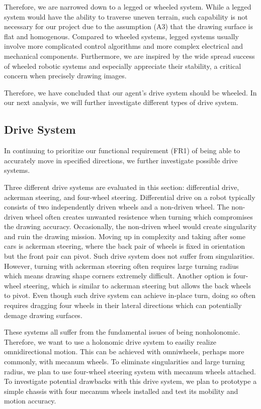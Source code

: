 Therefore, we are narrowed down to a legged or wheeled system. While a legged system would have the ability to traverse uneven terrain, such capability is not necessary for our project due to the assumption (A3) that the drawing surface is flat and homogenous. Compared to wheeled systems, legged systems usually involve more complicated control algorithms and more complex electrical and mechanical components. Furthermore, we are inspired by the wide spread success of wheeled robotic systems and especially appreciate their stability, a critical concern when precisely drawing images.

Therefore, we have concluded that our agent's drive system should be wheeled. In our next analysis, we will further investigate different types of drive system. 

\subsection{Drive System}
\label{sec:trade_drive}
In continuing to prioritize our functional requirement (FR1) of being able to accurately move in specified directions, we further investigate possible drive systems. 

Three different drive systems are evaluated in this section: differential drive, ackerman steering, and four-wheel steering. Differential drive on a robot typically consists of two independently driven wheels and a non-driven wheel. The non-driven wheel often creates unwanted resistence when turning which compromises the drawing accuracy. Occasionally, the non-driven wheel would create singularity and ruin the drawing mission. Moving up in complexity and taking after some cars is ackerman steering, where the back pair of wheels is fixed in orientation but the front pair can pivot. Such drive system does not suffer from singularities. However, turning with ackerman steering often requires large turning radius which means drawing shape corners extremely difficult. Another option is four-wheel steering, which is similar to ackerman steering but allows the back wheels to pivot. Even though such drive system can achieve in-place turn, doing so often requires dragging four wheels in their lateral directions which can potentially demage drawing surfaces.

These systems all suffer from the fundamental issues of being nonholonomic. Therefore, we want to use a holonomic drive system to easiliy realize omnidirectional motion. This can be achieved with omniwheels, perhaps more commonly, with mecanum wheels. To eliminate singularities and large turning radius, we plan to use four-wheel steering system with mecanum wheels attached. To investigate potential drawbacks with this drive system, we plan to prototype a simple chassis with four mecanum wheels installed and test its mobility and motion accuracy. 


